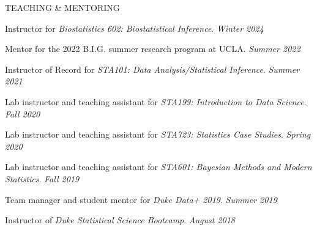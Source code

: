 \documentclass{resume} %
\begin{document}
\begin{rSection}{TEACHING \& MENTORING}
	
	Instructor for \emph{Biostatistics 602: Biostatistical Inference}.  \hfill {\em Winter 2024}
	
	Mentor for the 2022 B.I.G. summer research program at UCLA.  \hfill {\em Summer 2022}
	
	Instructor of Record for \emph{STA101: Data Analysis/Statistical Inference}. \hfill {\em Summer 2021}
	
	Lab instructor and teaching assistant for \emph{STA199: Introduction to Data Science}. \hfill {\em Fall 2020}
	
	
	Lab instructor and teaching assistant for \emph{STA723: Statistics Case Studies}. \hfill {\em Spring 2020}
	
	
	Lab instructor and teaching assistant for \emph{STA601: Bayesian Methods and Modern Statistics}. \hfill {\em Fall 2019}
	
	
	Team manager and student mentor for \emph{Duke Data+ 2019}. \hfill {\em Summer 2019}
	
	Instructor of \emph{Duke Statistical Science Bootcamp}. \hfill {\em August 2018}
\end{rSection}















%
%
%
%
%
%
%
%
%
%
\end{document}
